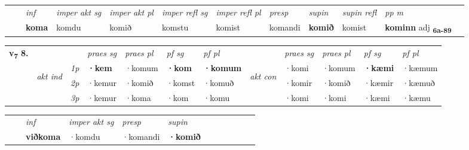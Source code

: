 \begin{tabular}{llllllllllll}
 & & \textit{inf} & \textit{imper akt sg} & \textit{imper akt pl} & \textit{imper refl sg} & \textit{imper refl pl} & \textit{presp} & \textit{supin} & \textit{supin refl} & \textit{pp m}     \\*
  & & \textbf{koma} & komdu  & komið & komstu & komist & komandi &  \textbf{komið} & komist & \textbf{kominn} adj \textbf{\textsubscript{6a-89}} \\*
\cmidrule{1-12}
\end{tabular}



\begin{tabular}{llllllllllll} \toprule
\multirow{4}{*}{{{\textbf{v{\textsubscript{7}}} \Large{\textbf{8.}}}}}  & &   &  \textit{praes sg}  & \textit{praes pl}  &\textit{ pf sg} & \textit{pf pl} &  &  \textit{praes sg}  & \textit{praes pl}  & \textit{pf sg} & \textit{pf pl } \\*
	\cmidrule{4-7} \cmidrule{9-12}
 & \multirow{3}{*}{\begin{turn}{90}\textit{akt ind}\end{turn}} & {\textit{1p}} & \textbf{·kem} & ·komum    & \textbf{·kom} & \textbf{·komum} & \multirow{3}{*}{\begin{turn}{90}\textit{akt con}\end{turn}} &·komi & ·komum & \textbf{·kæmi} & ·kæmum\\*
& &  {\textit{2p}} &  ·kemur  & ·komið   & ·komst & ·komuð & & ·komir & ·komið & ·kæmir & ·kæmuð \\*
& &  {\textit{3p}} & ·kemur & ·koma   & ·kom & ·komu & & ·komi & ·komi& ·kæmi & ·kæmu  \\*
\cmidrule{4-7} \cmidrule{9-12}
\end{tabular}


\begin{tabular}{llllllllllll}
 & & \textit{inf} & \textit{imper akt sg}    & \textit{presp} & \textit{supin}       \\*
  & & \textbf{viðkoma} & ·komdu     & ·komandi &  \textbf{·komið}   \\*
\cmidrule{1-12}
\end{tabular}



